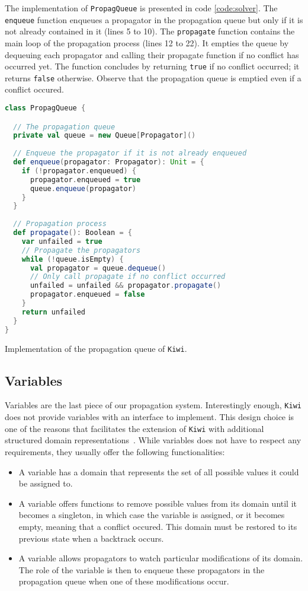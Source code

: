 \documentclass{llncs}
\begin{document}
The implementation of \texttt{PropagQueue} is presented in code \ref{code:solver}. 
The \texttt{enqueue} function enqueues a propagator in the propagation queue but only if it is not already contained in it (lines 5 to 10). 
The \texttt{propagate} function contains the main loop of the propagation process (lines 12 to 22). It empties the queue by dequeuing each propagator and calling their propagate function if no conflict has occurred yet. The function concludes by returning \texttt{true} if no conflict occurred; it returns \texttt{false} otherwise. Observe that the propagation queue is emptied even if a conflict occured. 

\begin{code}
\begin{lstlisting}[language=scala, style=lineNumber]
class PropagQueue {

  // The propagation queue
  private val queue = new Queue[Propagator]()
  
  // Enqueue the propagator if it is not already enqueued
  def enqueue(propagator: Propagator): Unit = {
    if (!propagator.enqueued) {
      propagator.enqueued = true
      queue.enqueue(propagator)
    }  
  }
  
  // Propagation process
  def propagate(): Boolean = {
    var unfailed = true
    // Propagate the propagators
    while (!queue.isEmpty) {
      val propagator = queue.dequeue()
      // Only call propagate if no conflict occurred
      unfailed = unfailed && propagator.propagate()
      propagator.enqueued = false
    }
    return unfailed
  }
}
\end{lstlisting}
\caption{Implementation of the propagation queue of \texttt{Kiwi}.}
\label{code:solver}
\end{code}

\subsection{Variables}

Variables are the last piece of our propagation system. 
Interestingly enough, \texttt{Kiwi} does not provide variables with an interface to implement. 
This design choice is one of the reasons that facilitates the extension of \texttt{Kiwi} with additional structured domain representations~\cite{handbook}.
While variables does not have to respect any requirements, they usually offer  the following functionalities:
\begin{itemize}
  \item A variable has a domain that represents the set of all possible values it could be assigned to. 
  \item A variable offers functions to remove possible values from its domain until it becomes a singleton, in which case the variable is assigned, or it becomes empty, meaning that a conflict occured. This domain must be restored to its previous state when a backtrack occurs. 
  \item A variable allows propagators to watch particular modifications of its domain. The role of the variable is then to enqueue these propagators in the propagation queue when one of these modifications occur.
\end{itemize} 
\end{document}
